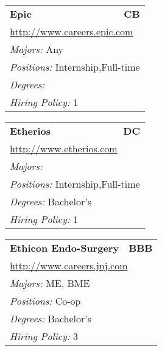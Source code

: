 \documentclass[twoside]{article}
\begin{document}
\begin{center}
\begin{multicols}{3}
\begin{FlushLeft}
\begin{minipage}{\columnwidth}
\end{minipage}
 
\begin{minipage}{\columnwidth}\begin{tabularx}{.95\columnwidth}{Xr}
                 {\Large\bf Epic} & {\Large\bf CB}\\
    \multicolumn{2}{p{.95\columnwidth}}{\url{http://www.careers.epic.com}}\\
    \multicolumn{2}{p{.95\columnwidth}}{\emph{Majors:} Any}\\
    \multicolumn{2}{p{.95\columnwidth}}{\emph{Positions:} Internship,Full-time}\\
    \multicolumn{2}{p{.95\columnwidth}}{\emph{Degrees:} }\\
    \multicolumn{2}{p{.95\columnwidth}}{\emph{Hiring Policy:} 1}\\
    \end{tabularx}
    
\end{minipage}
 
\begin{minipage}{\columnwidth}\begin{tabularx}{.95\columnwidth}{Xr}
                 {\Large\bf Etherios} & {\Large\bf DC}\\
    \multicolumn{2}{p{.95\columnwidth}}{\url{http://www.etherios.com}}\\
    \multicolumn{2}{p{.95\columnwidth}}{\emph{Majors:} }\\
    \multicolumn{2}{p{.95\columnwidth}}{\emph{Positions:} Internship,Full-time}\\
    \multicolumn{2}{p{.95\columnwidth}}{\emph{Degrees:} Bachelor's}\\
    \multicolumn{2}{p{.95\columnwidth}}{\emph{Hiring Policy:} 1}\\
    \end{tabularx}
    
\end{minipage}
 
\begin{minipage}{\columnwidth}\begin{tabularx}{.95\columnwidth}{Xr}
                 {\Large\bf Ethicon Endo-Surgery} & {\Large\bf BBB}\\
    \multicolumn{2}{p{.95\columnwidth}}{\url{http://www.careers.jnj.com}}\\
    \multicolumn{2}{p{.95\columnwidth}}{\emph{Majors:} ME, BME}\\
    \multicolumn{2}{p{.95\columnwidth}}{\emph{Positions:} Co-op}\\
    \multicolumn{2}{p{.95\columnwidth}}{\emph{Degrees:} Bachelor's}\\
    \multicolumn{2}{p{.95\columnwidth}}{\emph{Hiring Policy:} 3}\\
    \end{tabularx}
    

\end{minipage}
\end{FlushLeft}
\end{multicols}
\end{center}
\end{document}
